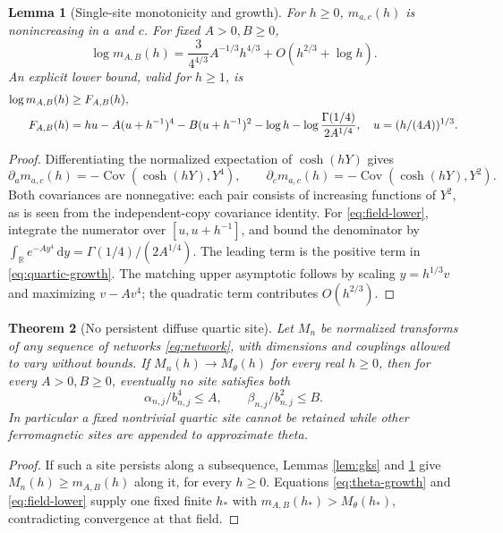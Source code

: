 \documentclass[11pt]{article}
\newtheorem{theorem}{Theorem}[section]
\newtheorem{lemma}[theorem]{Lemma}
\theoremstyle{remark}
\newcommand{\R}{\mathbb R}
\newcommand{\dd}{\,\mathrm d}
\newcommand{\Cov}{\operatorname{Cov}}
\numberwithin{equation}{section}
\begin{document}
\begin{lemma}[Single-site monotonicity and growth]\label{lem:site}
For \(h\ge0\), \(m_{a,c}(h)\) is nonincreasing in \(a\) and \(c\).
For fixed \(A>0,B\ge0\),
\begin{equation}\label{eq:quartic-growth}
 \log m_{A,B}(h)
 =\frac{3}{4^{4/3}}A^{-1/3}h^{4/3}
   +O(h^{2/3}+\log h).
\end{equation}
An explicit lower bound, valid for \(h\ge1\), is
\begin{align}
 \log m_{A,B}(h)&\ge F_{A,B}(h),\label{eq:field-lower}\\
 F_{A,B}(h)&=hu-A(u+h^{-1})^4-B(u+h^{-1})^2-\log h
  -\log\frac{\Gamma(1/4)}{2A^{1/4}},
 \quad u=(h/(4A))^{1/3}.\notag
\end{align}
\end{lemma}
\begin{proof}
Differentiating the normalized expectation of \(\cosh(hY)\) gives
\[
 \partial_a m_{a,c}(h)=-\Cov(\cosh(hY),Y^4),\qquad
 \partial_c m_{a,c}(h)=-\Cov(\cosh(hY),Y^2).
\]
Both covariances are nonnegative: each pair consists of increasing
functions of \(Y^2\), as is seen from the independent-copy covariance
identity. For \eqref{eq:field-lower}, integrate the numerator over
\([u,u+h^{-1}]\), and bound the denominator by
\(\int_\R e^{-Ay^4}\dd y=\Gamma(1/4)/(2A^{1/4})\).
The leading term is the positive term in \eqref{eq:quartic-growth}.
The matching upper asymptotic follows by scaling \(y=h^{1/3}v\) and
maximizing \(v-Av^4\); the quadratic term contributes \(O(h^{2/3})\).
\end{proof}

\begin{theorem}[No persistent diffuse quartic site]\label{thm:persistent}
Let \(M_n\) be normalized transforms of any sequence of networks
\eqref{eq:network}, with dimensions and couplings allowed to vary without
bounds. If \(M_n(h)\to M_\theta(h)\) for every real \(h\ge0\), then for
every \(A>0,B\ge0\), eventually no site satisfies both
\begin{equation}\label{eq:rectangle}
 \alpha_{n,j}/b_{n,j}^4\le A,\qquad
 \beta_{n,j}/b_{n,j}^2\le B.
\end{equation}
In particular a fixed nontrivial quartic site cannot be retained while
other ferromagnetic sites are appended to approximate theta.
\end{theorem}
\begin{proof}
If such a site persists along a subsequence, Lemmas \ref{lem:gks} and
\ref{lem:site} give \(M_n(h)\ge m_{A,B}(h)\) along it, for every \(h\ge0\).
Equations \eqref{eq:theta-growth} and \eqref{eq:field-lower} supply one
fixed finite \(h_*\) with \(m_{A,B}(h_*)>M_\theta(h_*)\), contradicting
convergence at that field.
\end{proof}
\end{document}
